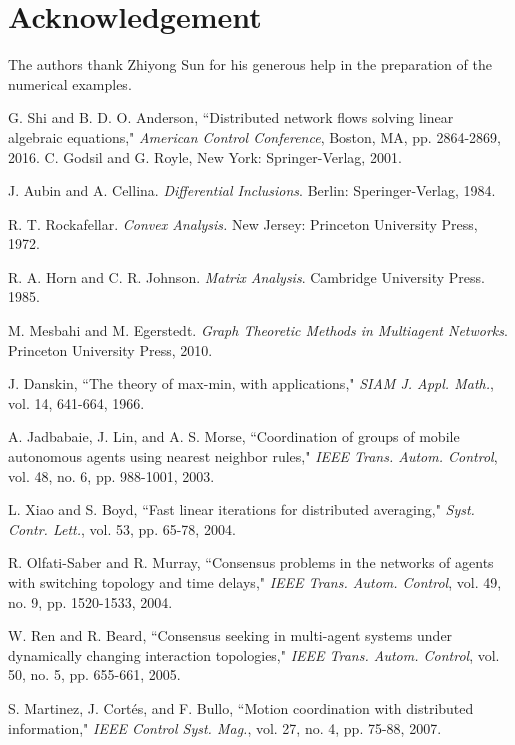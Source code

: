 \documentclass[a4paper, 11pt]{article}
\begin{document}
\section*{Acknowledgement}
The authors  thank Zhiyong Sun for his generous help in the preparation of the numerical examples.


\begin{thebibliography}{99}
 G. Shi and B. D. O. Anderson, ``Distributed network flows solving linear algebraic equations," {\em American Control Conference}, Boston, MA, pp. 2864-2869, 2016.
C. Godsil and G. Royle,
\newblock New York: Springer-Verlag, 2001.

 J. Aubin and A. Cellina. {\em Differential Inclusions}.  Berlin: Speringer-Verlag, 1984.

R. T. Rockafellar. {\em Convex Analysis.} New Jersey: Princeton University Press, 1972.

  R. A. Horn  and C. R. Johnson. {\em  Matrix Analysis}. Cambridge
University Press. 1985.

 M. Mesbahi and M. Egerstedt. {\em Graph Theoretic Methods in Multiagent Networks}. Princeton University Press, 2010.

 J. Danskin, ``The theory of max-min, with applications,"
{\em SIAM J. Appl. Math.}, vol. 14, 641-664, 1966.

A. Jadbabaie, J. Lin, and A. S. Morse,
``Coordination of groups of mobile autonomous agents using nearest neighbor rules,"
{\em IEEE Trans. Autom. Control}, vol. 48, no. 6, pp. 988-1001, 2003.

  L. Xiao and S. Boyd, ``Fast linear iterations for distributed averaging,"
{\em Syst. Contr. Lett.}, vol. 53, pp. 65-78, 2004.

 R. Olfati-Saber and R. Murray, ``Consensus problems in the networks
of agents with switching topology and time delays," {\em  IEEE Trans.
Autom. Control}, vol. 49, no. 9, pp. 1520-1533, 2004.

 W. Ren and R. Beard, ``Consensus seeking in multi-agent systems under dynamically changing interaction topologies," {\em IEEE Trans. Autom. Control}, vol. 50, no. 5, pp. 655-661, 2005.

 S. Martinez, J. Cort\'{e}s, and F. Bullo, ``Motion coordination with distributed
information," {\em IEEE Control Syst. Mag.}, vol. 27, no. 4, pp.
75-88, 2007.


\end{thebibliography}
\end{document}
